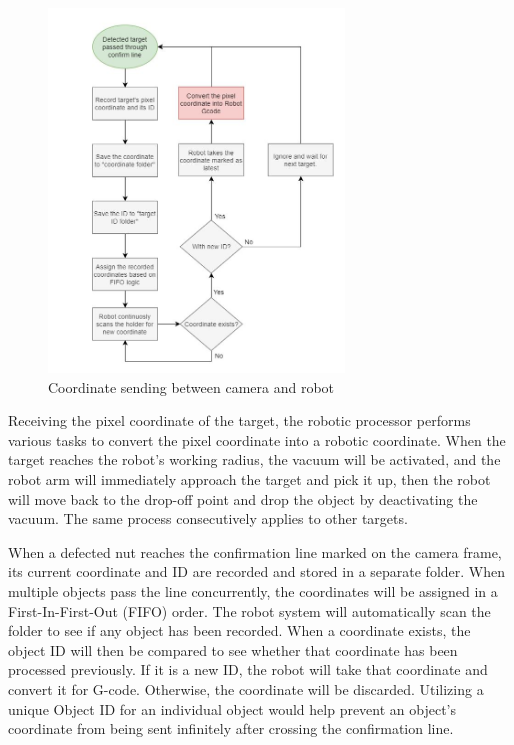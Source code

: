\documentclass[10pt, letterpaper]{article}
\begin{document}
    \begin{figure}[h]
        \centering
        \includegraphics[width=0.7\textwidth]{fig18.JPG}
        \caption{Coordinate sending between camera and robot}
    \end{figure}
    Receiving the pixel coordinate of the target, the robotic processor performs various tasks to convert the pixel coordinate into a robotic coordinate. When the target reaches the robot’s working radius, the vacuum will be activated, and the robot arm will immediately approach the target and pick it up, then the robot will move back to the drop-off point and drop the object by deactivating the vacuum. The same process consecutively applies to other targets. \par
    When a defected nut reaches the confirmation line marked on the camera frame, its current coordinate and ID are recorded and stored in a separate folder. When multiple objects pass the line concurrently, the coordinates will be assigned in a First-In-First-Out (FIFO) order. The robot system will automatically scan the folder to see if any object has been recorded. When a coordinate exists, the object ID will then be compared to see whether that coordinate has been processed previously. If it is a new ID, the robot will take that coordinate and convert it for G-code. Otherwise, the coordinate will be discarded. Utilizing a unique Object ID for an individual object would help prevent an object’s coordinate from being sent infinitely after crossing the confirmation line. \par
\end{document}
